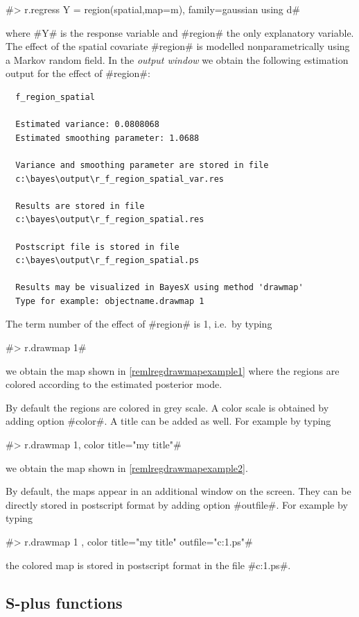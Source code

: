 #> r.regress Y = region(spatial,map=m), family=gaussian using d#

where #Y# is the response variable and #region# the only
explanatory variable. The effect of the spatial covariate #region#
is modelled nonparametrically  using a Markov random field. In the
{\em output window} we obtain the following estimation output for
the effect of #region#:

\begin{verbatim}
  f_region_spatial

  Estimated variance: 0.0808068
  Estimated smoothing parameter: 1.0688

  Variance and smoothing parameter are stored in file
  c:\bayes\output\r_f_region_spatial_var.res

  Results are stored in file
  c:\bayes\output\r_f_region_spatial.res

  Postscript file is stored in file
  c:\bayes\output\r_f_region_spatial.ps

  Results may be visualized in BayesX using method 'drawmap'
  Type for example: objectname.drawmap 1
\end{verbatim}

The term number of the effect of #region# is 1, i.e.~by typing

#> r.drawmap 1#

we obtain the map shown in \autoref{remlregdrawmapexample1} where
the regions are colored according to the estimated posterior mode.

By default the regions are colored in grey scale. A color scale is
obtained by adding option #color#. A title can be added as well.
For example by typing

#> r.drawmap 1, color title="my title"#

we obtain the map shown in \autoref{remlregdrawmapexample2}.

By default, the maps appear in an additional window on the screen.
They can be directly stored in postscript format by adding option
#outfile#. For example by typing

 #> r.drawmap 1 , color title="my title" outfile="c:\results\result1.ps"#

the colored map is stored in postscript format in the file
#c:\results\result1.ps#.

\subsection{S-plus functions}
\label{remlregsplus} 

